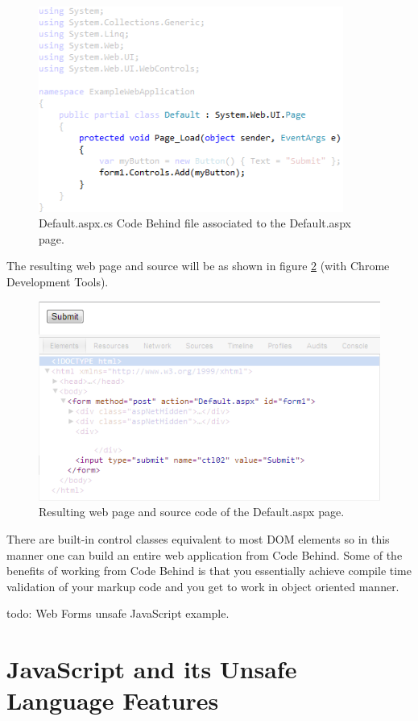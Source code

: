 				\begin{figure}
					\includegraphics[width=10cm]{resources/images/CodeBehind.png}
				\caption{Default.aspx.cs Code Behind file associated to the Default.aspx page.}
				\label{codeBehind}
			\end{figure}
		The resulting web page and source will be as shown in figure \ref{html} (with Chrome Development Tools).

				\begin{figure}
					\includegraphics[width=12cm]{resources/images/Html.png}
				\caption{Resulting web page and source code of the Default.aspx page.}
				\label{html}
			\end{figure}
		There are built-in control classes equivalent to most DOM elements so in this manner one can build an entire web application from Code Behind. Some of the benefits of working from Code Behind is that you essentially achieve compile time validation of your markup code and you get to work in object oriented manner.

		todo: Web Forms unsafe JavaScript example.


\section{JavaScript and its Unsafe Language Features} %
\label{sec:javascript_and_its_unsafe_language_feature}
	
